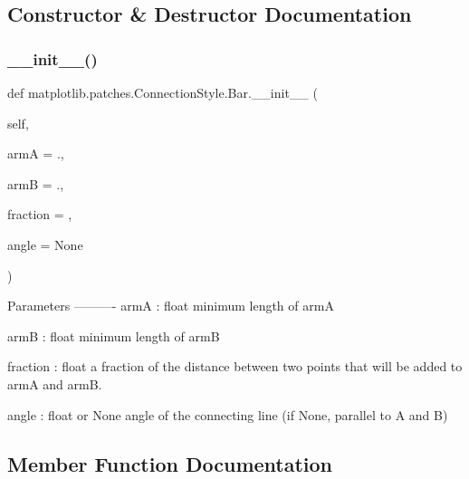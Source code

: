 \subsection{Constructor \& Destructor Documentation}
\mbox{\label{classmatplotlib_1_1patches_1_1ConnectionStyle_1_1Bar_aa9789d2ee165924bc7164b26ffea1254}} 
\subsubsection{\texorpdfstring{\+\_\+\+\_\+init\+\_\+\+\_\+()}{\_\_init\_\_()}}
{\footnotesize\ttfamily def matplotlib.\+patches.\+Connection\+Style.\+Bar.\+\_\+\+\_\+init\+\_\+\+\_\+ (\begin{DoxyParamCaption}\item[{}]{self,  }\item[{}]{armA = {.},  }\item[{}]{armB = {.},  }\item[{}]{fraction = {},  }\item[{}]{angle = {\ttfamily None} }\end{DoxyParamCaption})}

\begin{DoxyVerb}Parameters
----------
armA : float
    minimum length of armA

armB : float
    minimum length of armB

fraction : float
    a fraction of the distance between two points that
    will be added to armA and armB.

angle : float or None
    angle of the connecting line (if None, parallel
    to A and B)
\end{DoxyVerb}
 

\subsection{Member Function Documentation}
\mbox{\label{classmatplotlib_1_1patches_1_1ConnectionStyle_1_1Bar_a3b28912b6bd986c0e393121f2bb2d624}} 
